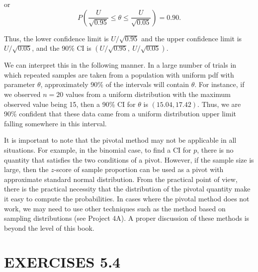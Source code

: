 or
\[
P\left(\frac{U}{\sqrt{0.95}} \leq \theta \leq \frac{U}{\sqrt{0.05}}\right) = 0.90.
\]

Thus, the lower confidence limit is $U/\sqrt{0.95}$ and the upper confidence limit is $U/\sqrt{0.05}$, and the 90\% CI is $(U/\sqrt{0.95},\ U/\sqrt{0.05})$.

We can interpret this in the following manner. In a large number of trials in which repeated samples are taken from a population with uniform pdf with parameter $\theta$, approximately 90\% of the intervals will contain $\theta$. For instance, if we observed $n = 20$ values from a uniform distribution with the maximum observed value being 15, then a 90\% CI for $\theta$ is $(15.04, 17.42)$. Thus, we are 90\% confident that these data came from a uniform distribution upper limit falling somewhere in this interval.

It is important to note that the pivotal method may not be applicable in all situations. For example, in the binomial case, to find a CI for $p$, there is no quantity that satisfies the two conditions of a pivot. However, if the sample size is large, then the $z$-score of sample proportion can be used as a pivot with approximate standard normal distribution. From the practical point of view, there is the practical necessity that the distribution of the pivotal quantity make it easy to compute the probabilities. In cases where the pivotal method does not work, we may need to use other techniques such as the method based on sampling distributions (see Project 4A). A proper discussion of these methods is beyond the level of this book.

\section*{EXERCISES 5.4}

